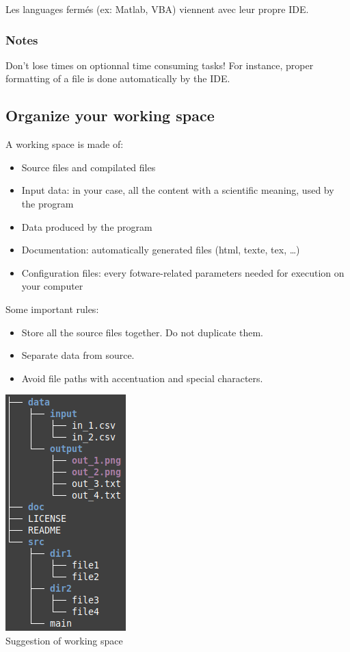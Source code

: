 \documentclass[11pt]{article}
\begin{document}
				Les languages fermés (ex: Matlab, VBA) viennent avec leur propre IDE.

			\subsubsection{Notes}
				Don't lose times on optionnal time consuming tasks! For instance, proper formatting of a file is done automatically by the IDE.

		\subsection{Organize your working space}
			\begin{minipage}{.65\textwidth}
				A working space is made of:
				\begin{itemize}
					\item Source files and compilated files
					\item Input data: in your case, all the content with a scientific meaning, used by the program
					\item Data produced by the program
					\item Documentation: automatically generated files (html, texte, tex, \ldots)
					\item Configuration files: every fotware-related parameters needed for execution on your computer
				\end{itemize}
				Some important rules:
				\begin{itemize}
					\item Store all the source files together. Do not duplicate them.
					\item Separate data from source.
					\item Avoid file paths with accentuation and special characters.
				\end{itemize}
			\end{minipage}
			\begin{minipage}{.3\textwidth}
				\centering
				\includegraphics[width=4 cm]{figures/tree}
				\\
				Suggestion of working space
			\end{minipage}
\end{document}
